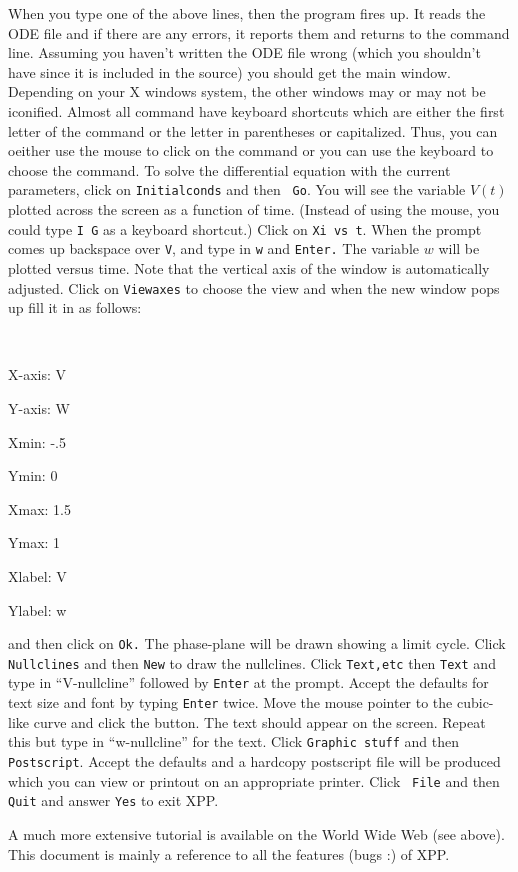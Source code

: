 \documentclass{article}
\begin{document}
When you type one of the above lines, then the program fires up. It
reads the ODE file and if there are any errors, it reports them and
returns to the command line.  Assuming you haven't written the ODE
file wrong (which you shouldn't have since it is included in the
source) you should get the main window.  Depending on your X windows
system, the other windows may or may not be iconified.  Almost all
command have keyboard shortcuts which are either the first letter of
the command or the letter in parentheses or capitalized. Thus, you can
oeither use the mouse to click on the command or you can use the
keyboard to choose the command.  To solve the differential equation
with the current parameters, click on {\tt Initialconds} and then {\tt
Go}. You will see the variable $V(t)$ plotted across the screen as a
function of time.  (Instead of using the mouse, you could type {\tt I
G} as a keyboard shortcut.)  Click on {\tt Xi vs t}.  When the prompt
comes up backspace over {\tt V}, and type in {\tt w} and {\tt Enter.}
The variable $w$ will be plotted versus time.  Note that the vertical
axis of the window is automatically adjusted.  Click on {\tt Viewaxes}
to choose the view and when the new window pops up fill it in as follows:
\begin{itemize} {\tt
\item X-axis: V
\item Y-axis: W
\item Xmin: -.5
\item Ymin: 0
\item Xmax: 1.5
\item Ymax: 1
\item Xlabel: V
\item Ylabel: w
}
\end{itemize}
and then click on {\tt Ok.}  The phase-plane will be drawn showing a
limit cycle. Click {\tt Nullclines} and then {\tt New} to draw the
nullclines. Click {\tt Text,etc} then {\tt Text} and type in
``V-nullcline'' followed by {\tt Enter} at the prompt.  Accept the
defaults for text size and font by typing {\tt Enter} twice.  Move the
mouse pointer to the cubic-like curve and click the button.  The text
should appear on the screen.  Repeat this but type in ``w-nullcline''
for the text.  Click {\tt Graphic stuff} and then {\tt Postscript}.
Accept the defaults and a hardcopy postscript file will be produced
which you can view or printout on an appropriate printer.  Click {\tt
File} and then {\tt Quit} and answer {\tt Yes} to exit XPP.  

A much more extensive tutorial is available on the World Wide Web (see
above). This document is mainly a reference to all the features (bugs
:) of XPP.
\end{document}
